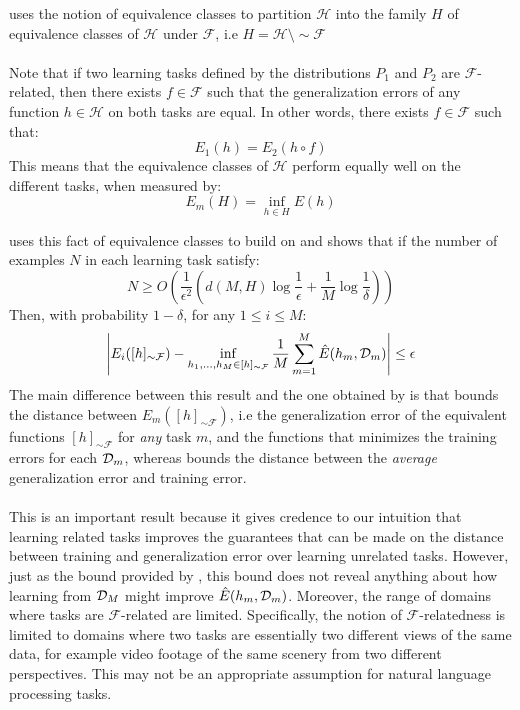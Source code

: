 \citet{ben2003} uses the notion of equivalence classes to partition $\mathcal{H}$ into the family $H$ of equivalence classes of $\mathcal{H}$ under $\mathcal{F}$, i.e $H = \mathcal{H} \setminus \sim \mathcal{F}$
\\\\
Note that if two learning tasks defined by the distributions $P_1$ and $P_2$ are $\mathcal{F}$-related, then there exists $f \in \mathcal{F}$ such that the generalization errors of any function $h \in \mathcal{H}$ on both tasks are equal. In other words, there exists $f \in \mathcal{F}$ such that:
$$
E_1(h) = E_2(h \circ f)
$$
This means that the equivalence classes of $\mathcal{H}$ perform equally well on the different tasks, when measured by:
$$
E_m(H) = \inf\limits_{h \in H}E(h)
$$

\citet{ben2003} uses this fact of equivalence classes to build on \citet{baxter2000} and shows that if the number of examples $N$ in each learning task satisfy:
$$
N \geq O\left(\frac{1}{\epsilon^2}\left(d(M, H) \log \frac{1}{\epsilon} + \frac{1}{M} \log \frac{1}{\delta}\right)\right)
$$
Then, with probability $1 - \delta$, for any $1 \leq i \leq M$:
$$
\left| E_i([h]_{\sim \mathcal{F}}) - \inf\limits_{h_1,\dots,h_M \in [h]_{\sim \mathcal{F}}} \frac{1}{M}\sum\limits_{m = 1}^M \hat{E}(h_m, \mathcal{D}_m)\right|  \leq \epsilon
$$
The main difference between this result and the one obtained by \citet{baxter2000} is that \citet{ben2003} bounds the distance between $E_m([h]_{\sim \mathcal{F}})$, i.e the generalization error of the equivalent functions $[h]_{\sim \mathcal{F}}$ for \emph{any} task $m$, and the functions that minimizes the training errors for each $\mathcal{D}_m$, whereas \citet{baxter2000} bounds the distance between the \emph{average} generalization error and training error.
\\\\
This is an important result because it gives credence to our intuition that learning related tasks improves the guarantees that can be made on the distance between training and generalization error over learning unrelated tasks. However, just as the bound provided by \citet{baxter2000}, this bound does not reveal anything about how learning from $\mathcal{D}_M$ might improve $\hat{E}(h_m, \mathcal{D}_m)$. Moreover, the range of domains where tasks are $\mathcal{F}$-related are limited. Specifically, the notion of $\mathcal{F}$-relatedness is limited to domains where two tasks are essentially two different views of the same data, for example video footage of the same scenery from two different perspectives. This may not be an appropriate assumption for natural language processing tasks.